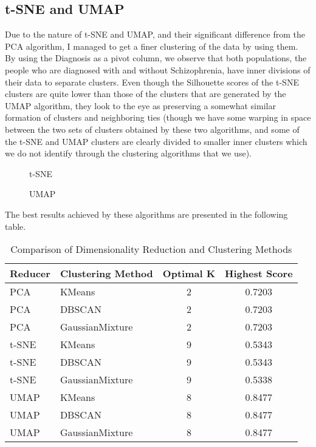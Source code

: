 \documentclass{article}
\begin{document}
\subsection{t-SNE and UMAP}
Due to the nature of t-SNE and UMAP, and their significant difference from the PCA algorithm, I managed to get a finer clustering of the data by using them. By using the Diagnosis as a pivot column, we observe that both populations, the people who are diagnosed with and without Schizophrenia, have inner divisions of their data to separate clusters. Even though the Silhouette scores of the t-SNE clusters are quite lower than those of the clusters that are generated by the UMAP algorithm, they look to the eye as preserving a somewhat similar formation of clusters and neighboring ties (though we have some warping in space between the two sets of clusters obtained by these two algorithms, and some of the t-SNE and UMAP clusters are clearly divided to smaller inner clusters which we do not identify through the clustering algorithms that we use). 
\begin{figure}[H]
    \centering
    \caption{t-SNE}
\end{figure}

\begin{figure}[H]
    \centering
    \caption{UMAP}
\end{figure}
The best results achieved by these algorithms are presented in the following table.

\begin{table}[h]
\centering
\begin{tabular}{|l|l|c|c|}
\hline
\textbf{Reducer} & \textbf{Clustering Method} & \textbf{Optimal K} & \textbf{Highest Score} \\
\hline
PCA & KMeans & 2 & 0.7203 \\
PCA & DBSCAN & 2 & 0.7203 \\
PCA & GaussianMixture & 2 & 0.7203 \\
t-SNE & KMeans & 9 & 0.5343 \\
t-SNE & DBSCAN & 9 & 0.5343 \\
t-SNE & GaussianMixture & 9 & 0.5338 \\
UMAP & KMeans & 8 & 0.8477 \\
UMAP & DBSCAN & 8 & 0.8477 \\
UMAP & GaussianMixture & 8 & 0.8477 \\
\hline
\end{tabular}
\caption{Comparison of Dimensionality Reduction and Clustering Methods}
\label{tab:reduction_clustering_comparison}
\end{table}
\end{document}
